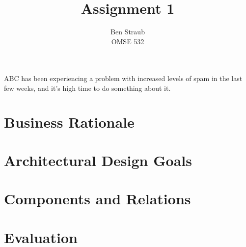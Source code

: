 \documentclass[11pt,letterpaper]{article}
\begin{document}
\author{Ben Straub\\OMSE 532}
\title{Assignment 1}
\maketitle


ABC has been experiencing a problem with increased levels of spam in the last few weeks, and it's
high time to do something about it.

\section{Business Rationale}

\section{Architectural Design Goals}

\section{Components and Relations}

\section{Evaluation}
\end{document}
